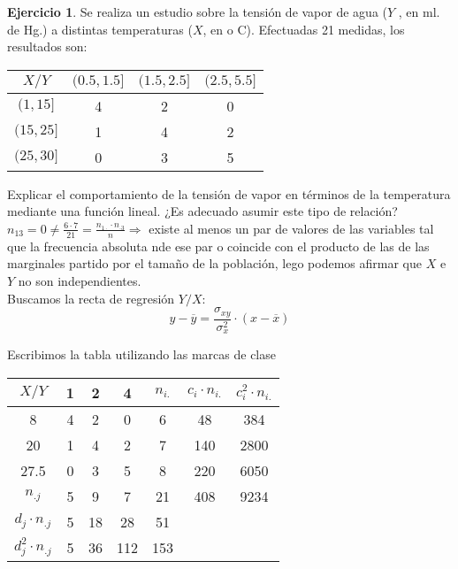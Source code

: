 \documentclass[a4paper, 12pt]{article}
\theoremstyle{definition}
\newtheorem{ej}{Ejercicio}
\begin{document}
\begin{ej}
Se realiza un estudio sobre la tensión de vapor de agua ($Y$ , en ml. de Hg.) a distintas temperaturas
($X$, en o C). Efectuadas 21 medidas, los resultados son:

\begin{center}
\begin{tabular}{c|ccc}
    $X/Y$ & $(0.5, 1.5]$ & $(1.5, 2.5]$ & $(2.5, 5.5]$ \\
    \hline
    $(1, 15]$ & 4 & 2 & 0 \\
    $(15, 25]$ & 1 & 4 & 2 \\
    $(25, 30]$ & 0 & 3 & 5 \\
\end{tabular}
\end{center}

Explicar el comportamiento de la tensión de vapor en términos de la temperatura mediante una
función lineal. ¿Es adecuado asumir este tipo de relación? \\

\(n_{13} =  0 \not= \frac{6\cdot7}{21} = \frac{n_{1\cdot}\cdot n_{\cdot3}}{n}\Longrightarrow\) existe al menos un par de valores de las variables tal que la frecuencia absoluta nde ese par o coincide con el producto de las de las marginales partido por el tamaño de la población, lego podemos afirmar que $X$ e $Y$ no son independientes. \\

Buscamos la recta de regresión $Y/X$:
\[
y - \overline{y} = \frac{\sigma_{xy}}{\sigma_{x}^2} \cdot (x - \overline{x})
\]

Escribimos la tabla utilizando las marcas de clase \\

\begin{centering}
\begin{tabular}{c|ccc|c|c|c|}
    $X/Y$ & 1 & 2 & 4 & $n_{i.}$ & $c_i\cdot n_{i.}$ & $c_i^2\cdot n_{i.}$ \\
    \hline
    8 & 4 & 2 & 0 & 6 & 48 & 384 \\
    20 & 1 & 4 & 2 & 7 & 140 & 2800 \\
    27.5 & 0 & 3 & 5 & 8 & 220 & 6050 \\
    \hline
    $n_{.j}$ & 5 & 9 & 7 & 21 & 408 & 9234 \\
    \hline
    $d_{j}\cdot n_{.j}$ & 5 & 18 & 28 & 51 \\
    \hline
    $d_{j}^2\cdot n_{.j}$ & 5 & 36 & 112 & 153 \\
    \hline
\end{tabular}
\end{centering} \\
\\


\end{ej}
\end{document}
